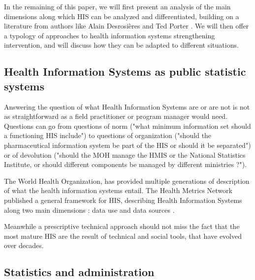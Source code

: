 

In the remaining of this paper, we will first present an analysis of the main dimensions along which HIS can be analyzed and differentiated, building on a literature from authors like Alain Desrosières \cite{desrosieres_administrateur_1998} and Ted Porter \cite{porter_trust_1996}. We will then offer a typology of approaches to health information systems strengthening intervention, and will discuss how they can be adapted to different situations.


\subsection{Health Information Systems as public statistic systems}

Answering the question of what Health Information Systems are or are not is not as straightforward as a field practitioner or program manager would need. Questions can go from questions of norm ("what minimum information set should a functioning HIS include") to questions of organization ("should the pharmaceutical information system be part of the HIS or should it be separated") or of devolution ("should the MOH manage the HMIS or the National Statistics Institute, or should different components be managed by different ministries ?").

The World Health Organization, has provided multiple generations of description of what the health information systems entail. The Health Metrics Network published a general framework for HIS, describing Health Information Systems along two main dimensions : data use and data sources \cite{health_metrics_network_framework_2008}.

Meanwhile a prescriptive technical approach should not miss the fact that the most mature HIS are the result of technical and social tools, that have evolved over decades.



\subsection{Statistics and administration}


